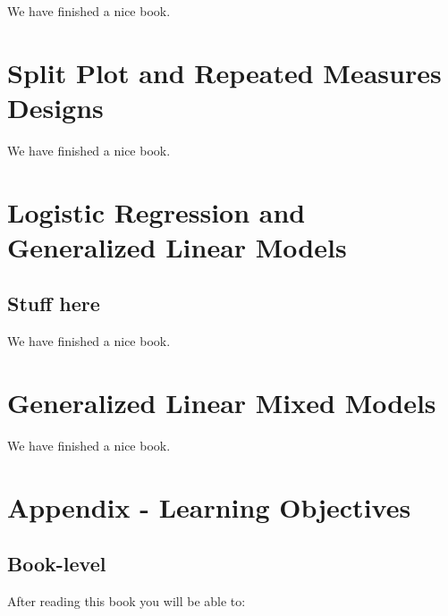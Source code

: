 \documentclass[
]{book}
\theoremstyle{definition}
\theoremstyle{definition}
\theoremstyle{definition}
\theoremstyle{remark}
\begin{document}
We have finished a nice book.

\hypertarget{repeatedmeasures}{%
\chapter{Split Plot and Repeated Measures Designs}\label{repeatedmeasures}}

We have finished a nice book.

\hypertarget{logistic}{%
\chapter{Logistic Regression and Generalized Linear Models}\label{logistic}}

\hypertarget{stuff-here}{%
\section{Stuff here}\label{stuff-here}}

We have finished a nice book.

\hypertarget{glmm}{%
\chapter{Generalized Linear Mixed Models}\label{glmm}}

We have finished a nice book.

\hypertarget{learningobj}{%
\chapter{Appendix - Learning Objectives}\label{learningobj}}

\hypertarget{book-level}{%
\section{Book-level}\label{book-level}}

After reading this book you will be able to:
\end{document}
